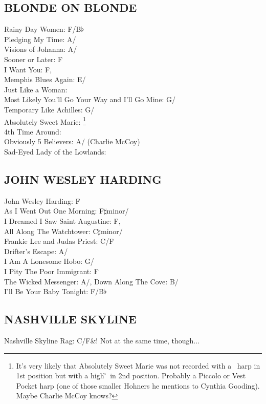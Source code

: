 \subsection{BLONDE ON BLONDE}
Rainy Day Women: F/B$\flat$\\ Pledging My Time: A/\D\\ Visions of Johanna: A/\D\\ Sooner or Later: F\\ I Want You: F,\\
Memphis Blues Again: E/\A\\ Just Like a Woman: \E\\ Most Likely You'll Go Your Way and I'll Go Mine: G/\C\\ Temporary Like Achilles: G/\C\\ Absolutely Sweet Marie: \D\footnote{It's very likely that Absolutely Sweet
Marie was not recorded with a \D~harp in 1st position but with a high
\G~in 2nd position. Probably a Piccolo or Vest Pocket harp (one of
those smaller Hohners he mentions to Cynthia Gooding). Maybe
Charlie McCoy knows?}\\ 4th Time Around: \E\\ Obviously 5 Believers: A/\D
(Charlie McCoy)\\ Sad-Eyed Lady of the Lowlands: \D\\


\subsection{JOHN WESLEY HARDING}
John Wesley Harding: F\\ As I Went Out One Morning: F$\sharp$minor/\A\\ I Dreamed I Saw Saint Augustine: F,\\
All Along The Watchtower: C$\sharp$minor/\E\\ Frankie Lee and Judas Priest: C/F\\ Drifter's Escape: A/\D\\ I Am A Lonesome Hobo: G/\C\\ I Pity The  Poor Immigrant: F\\ The Wicked Messenger: A/\D,
Down Along The Cove: B/\E\\ I'll Be Your Baby Tonight: F/B$\flat$


\subsection{NASHVILLE SKYLINE}
Nashville Skyline Rag: C/F\&\C! Not at the same time, though...


